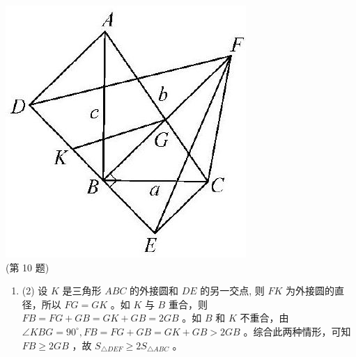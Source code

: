 \documentclass[10pt]{article}
\begin{document}
\includegraphics[max width=\textwidth, center]{2024_10_30_66b8e5e701da2093c133g-098}\\
(第 10 题)

\begin{enumerate}
  \item (2) 设 $K$ 是三角形 $A B C$ 的外接圆和 $D E$ 的另一交点, 则 $F K$ 为外接圆的直径，所以 $F G=G K$ 。如 $K$ 与 $B$ 重合，则 $F B=F G+G B=G K+G B=2 G B$ 。如 $B$ 和 $K$ 不重合，由 $\angle K B G=90^{\circ}, F B=F G+G B=G K+G B>2 G B$ 。综合此两种情形，可知 $F B \geqslant 2 G B$ ，故 $S_{\triangle D E F} \geqslant 2 S_{\triangle A B C}$ 。
\end{enumerate}
\end{document}
